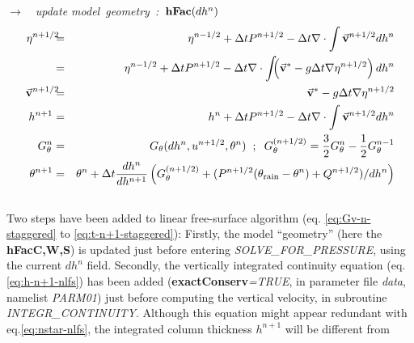 \hspace{3cm}$\longrightarrow$~~{\it update model~geometry~:~}${\bf hFac}(dh^n)$\\
\begin{eqnarray}
\eta^{n+1/2} \hspace{-2mm} & = &
\eta^{n-1/2} + \Delta t P^{n+1/2} - \Delta t
  \nabla \cdot \int \vec{\bf v}^{n+1/2} dh^{n} \nonumber \\
             & = & \eta^{n-1/2} + \Delta t P^{n+1/2} - \Delta t
  \nabla \cdot \int \!\!\! \left( \vec{\bf v}^* - g \Delta t \nabla \eta^{n+1/2} \right) dh^{n}
\label{eq:nstar-nlfs} \\
\vec{\bf v}^{n+1/2}\hspace{-2mm} & = &
\vec{\bf v}^{*} - g \Delta t \nabla \eta^{n+1/2}
\label{eq:v-n+1-nlfs} \\
h^{n+1} & = & h^{n} + \Delta t P^{n+1/2} - \Delta t
  \nabla \cdot \int \vec{\bf v}^{n+1/2} dh^{n}
\label{eq:h-n+1-nlfs} \\
G_{\theta}^{n} & = & G_{\theta} ( dh^{n}, u^{n+1/2}, \theta^{n} )
\hspace{+2mm};\hspace{+2mm}
G_{\theta}^{(n+1/2)} = \frac{3}{2} G_{\theta}^{n} - \frac{1}{2} G_{\theta}^{n-1}
\label{eq:Gt-n-nlfs} \\
\theta^{n+1} & = &\theta^{n} + \Delta t \frac{dh^n}{dh^{n+1}} \left(
G_{\theta}^{(n+1/2)}
+( P^{n+1/2} (\theta_{\mathrm{rain}}-\theta^n) + Q^{n+1/2})/dh^n \right)
\nonumber \\
& & \label{eq:t-n+1-nlfs}
\end{eqnarray}
Two steps have been added to linear free-surface algorithm
(eq. \ref{eq:Gv-n-staggered} to \ref{eq:t-n+1-staggered}):
Firstly, the model ``geometry''
(here the {\bf hFacC,W,S}) is updated just before entering {\it
SOLVE\_FOR\_PRESSURE}, using the current $dh^{n}$ field.
Secondly, the vertically integrated continuity equation
(eq.\ref{eq:h-n+1-nlfs}) has been added ({\bf exactConserv}{\em =TRUE},
in parameter file {\em data}, namelist {\em PARM01})
just before computing the vertical velocity, in subroutine
{\em INTEGR\_CONTINUITY}.
Although this equation might appear redundant with eq.\ref{eq:nstar-nlfs},
the integrated column thickness $h^{n+1}$ will be different from
